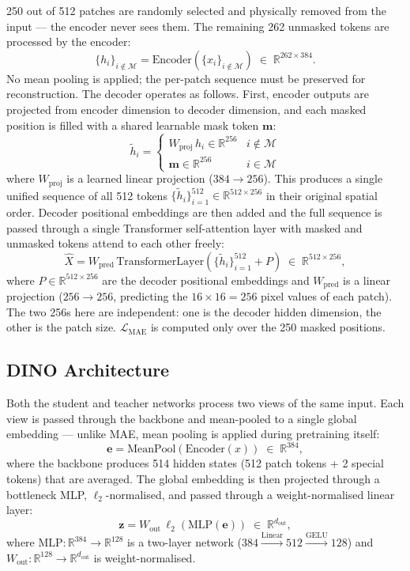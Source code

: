 \documentclass{article}
\begin{document}
250 out of 512 patches are randomly selected and physically removed from the input — the encoder never sees them. The remaining 262 unmasked tokens are processed by the encoder:
\[
    \{h_i\}_{i \notin \mathcal{M}} = \text{Encoder}\!\left(\{x_i\}_{i \notin \mathcal{M}}\right) \;\in\; \mathbb{R}^{262 \times 384}.
\]
No mean pooling is applied; the per-patch sequence must be preserved for reconstruction. The decoder operates as follows. First, encoder outputs are projected from encoder dimension to decoder dimension, and each masked position is filled with a shared learnable mask token $\mathbf{m}$:
\[
    \tilde{h}_i = \begin{cases} W_{\text{proj}}\,h_i \in \mathbb{R}^{256} & i \notin \mathcal{M} \\ \mathbf{m} \in \mathbb{R}^{256} & i \in \mathcal{M} \end{cases}
\]
where $W_{\text{proj}}$ is a learned linear projection ($384 \to 256$). This produces a single unified sequence of all 512 tokens $\{\tilde{h}_i\}_{i=1}^{512} \in \mathbb{R}^{512 \times 256}$ in their original spatial order. Decoder positional embeddings are then added and the full sequence is passed through a single Transformer self-attention layer with masked and unmasked tokens attend to each other freely:
\[
    \hat{X} = W_{\text{pred}}\,\text{TransformerLayer}\!\left(\{\tilde{h}_i\}_{i=1}^{512} + P\right) \;\in\; \mathbb{R}^{512 \times 256},
\]
where $P \in \mathbb{R}^{512 \times 256}$ are the decoder positional embeddings and $W_{\text{pred}}$ is a linear projection ($256 \to 256$, predicting the $16{\times}16{=}256$ pixel values of each patch). The two 256s here are independent: one is the decoder hidden dimension, the other is the patch size. $\mathcal{L}_\text{MAE}$ is computed only over the 250 masked positions.

\subsection{DINO Architecture}

Both the student and teacher networks process two views of the same input. Each view is passed through the backbone and mean-pooled to a single global embedding — unlike MAE, mean pooling is applied during pretraining itself:
\[
    \mathbf{e} = \text{MeanPool}\!\left(\text{Encoder}(x)\right) \;\in\; \mathbb{R}^{384},
\]
where the backbone produces 514 hidden states (512 patch tokens + 2 special tokens) that are averaged. The global embedding is then projected through a bottleneck MLP, $\ell_2$-normalised, and passed through a weight-normalised linear layer:
\[
    \mathbf{z} = W_\text{out}\,\ell_2\!\left(\text{MLP}(\mathbf{e})\right) \;\in\; \mathbb{R}^{d_\text{out}},
\]
where $\text{MLP}: \mathbb{R}^{384} \to \mathbb{R}^{128}$ is a two-layer network ($384 \xrightarrow{\text{Linear}} 512 \xrightarrow{\text{GELU}} 128$) and $W_\text{out}: \mathbb{R}^{128} \to \mathbb{R}^{d_\text{out}}$ is weight-normalised.
\end{document}
